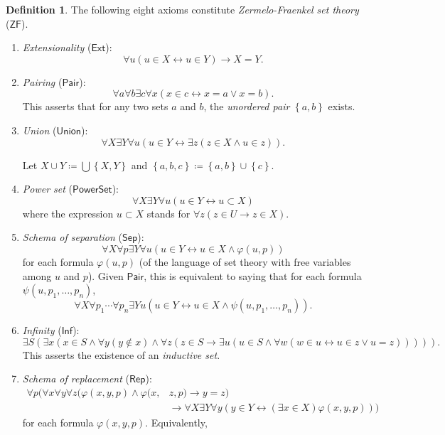 \documentclass[10pt,letterpaper,cm]{nupset}
\theoremstyle{definition}
\newtheorem{definition}{Definition}[subsection]
\theoremstyle{theorem}
\theoremstyle{remark}
\newcommand{\1}{\mathbf{1}}
\newcommand{\0}{\vec 0}
\newcommand{\zf}{\mathsf{ZF}}
\begin{document}
\begin{definition}
 The following eight axioms constitute \textit{Zermelo-Fraenkel set theory} ($\zf$). 
\begin{enumerate}
\item \textit{Extensionality} ($\mathsf{Ext}$):
\[
\forall u(u \in X \leftrightarrow u \in Y) \rightarrow X=Y.
\]
\item \textit{Pairing} ($\mathsf{Pair}$):
\[
\forall a \forall b \exists c \forall x(x \in c \leftrightarrow x=a \vee x=b).
\]
This asserts that for any two sets $a$ and $b$, the \textit{unordered pair} $\left\{a,b\right\}$ exists. 
\item \textit{Union} ($\mathsf{Union}$):
\[
\forall X \exists Y \forall u(u \in Y \leftrightarrow \exists z(z \in X \wedge u \in z)).
\]

Let $X \cup Y \coloneqq \bigcup \left\{X, Y\right\}$ and $\left\{a,b,c\right\} \coloneqq \left\{a,b\right\} \cup \left\{c\right\}$.
\item \textit{Power set}  ($\mathsf{PowerSet}$):
\[
\forall X \exists Y \forall u(u \in Y \leftrightarrow u \subset X)
\]
where the expression $u \subset X$ stands for $\forall z(z \in U \rightarrow z \in X)$.
\item \textit{Schema of separation} ($\mathsf{Sep}$):
\[
\forall X \forall p \exists Y \forall u(u \in Y \leftrightarrow u \in X \wedge \varphi(u, p))
\]
for each formula $\varphi(u, p)$ (of the language of set theory with free variables among $u$ and $p$). Given $\mathsf{Pair}$, this is equivalent to saying that for each formula $\psi(u, p_1, \ldots, p_n)$,
\[\forall X \forall p_{1} \cdots \forall p_{n} \exists Y u\left(u \in Y \leftrightarrow u \in X \wedge \psi\left(u, p_{1}, \ldots, p_{n}\right)\right).\] 
\item \textit{Infinity} ($\mathsf{Inf}$):
\[
\exists S(\exists x(x\in S\land\forall y(y\notin x)\land\forall z(z\in S\rightarrow\exists u(u\in S\land\forall w(w\in u\leftrightarrow u\in z\lor u=z))))).
\]
This asserts the existence of an \textit{inductive set}. 
\item \textit{Schema of replacement} ($\mathsf{Rep}$):
\[
\begin{aligned} \forall p( \forall x \forall y \forall z(\varphi(x, y, p) \wedge \varphi(x,& z, p ) \rightarrow y=z ) \\ & \rightarrow \forall X \exists Y \forall y(y \in Y \leftrightarrow(\exists x \in X) \varphi(x, y, p)) )\end{aligned}
\] for each formula $\varphi(x,y, p)$. Equivalently, 

\end{enumerate}
\end{definition}
\end{document}
